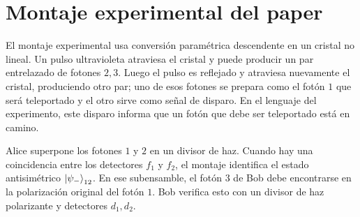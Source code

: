 \documentclass[../main.tex]{subfiles}
\begin{document}
\section{Montaje experimental del paper}

El montaje experimental usa conversión paramétrica descendente en un cristal no lineal. Un pulso ultravioleta atraviesa el cristal y puede producir un par entrelazado de fotones $2,3$. Luego el pulso es reflejado y atraviesa nuevamente el cristal, produciendo otro par; uno de esos fotones se prepara como el fotón $1$ que será teleportado y el otro sirve como señal de disparo. En el lenguaje del experimento, este disparo informa que un fotón que debe ser teleportado está en camino.

Alice superpone los fotones $1$ y $2$ en un divisor de haz. Cuando hay una coincidencia entre los detectores $f_1$ y $f_2$, el montaje identifica el estado antisimétrico $\ket{\psi_-}_{12}$. En ese subensamble, el fotón $3$ de Bob debe encontrarse en la polarización original del fotón $1$. Bob verifica esto con un divisor de haz polarizante y detectores $d_1,d_2$.
\end{document}
